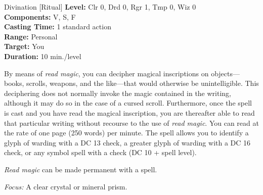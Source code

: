 {Divination [Ritual]}
{
	\textbf{Level:}
	Clr 0, Drd 0, Rgr 1, Tmp 0, Wiz 0\\
	\textbf{Components:}
	V, S, F\\
	\textbf{Casting Time:}
	1 standard action\\
	\textbf{Range:}
	Personal\\
	\textbf{Target:}
	You\\
	\textbf{Duration:}
	10 min./level\\
}
{
	By means of \emph{read magic}, you can decipher magical inscriptions on objects---books, scrolls, weapons, and the like---that would otherwise be unintelligible. This deciphering does not normally invoke the magic contained in the writing, although it may do so in the case of a cursed scroll. Furthermore, once the spell is cast and you have read the magical inscription, you are thereafter able to read that particular writing without recourse to the use of \emph{read magic}. You can read at the rate of one page (250 words) per minute. The spell allows you to identify a glyph of warding with a DC 13  check, a greater glyph of warding with a DC 16  check, or any symbol spell with a  check (DC 10 + spell level).

	\emph{Read magic} can be made permanent with a  spell.

	\textit{Focus:}
	A clear crystal or mineral prism.

}
